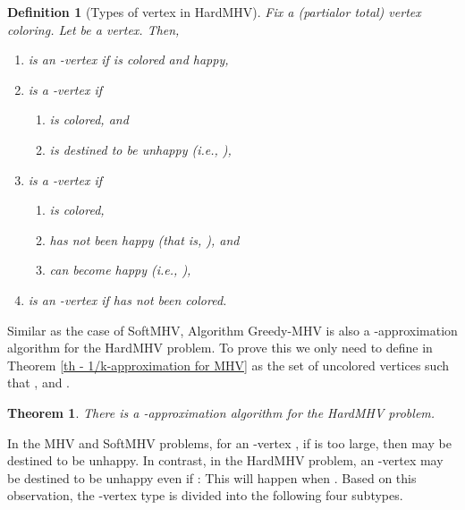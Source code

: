 \documentclass[11pt]{article}
\newtheorem{theorem}{Theorem}[section]
\newtheorem{definition}{Definition}[section]
\newcommand{\qed}{\vrule height4pt width4pt depth2pt}
\begin{document}
\begin{definition}[Types of vertex in HardMHV]
Fix a (partialor total) vertex coloring. Let  be a vertex. Then,
\begin{enumerate}
\item  is an -vertex if  is colored and happy,

\item  is a -vertex if
\begin{enumerate}
\item  is colored, and
\item  is destined to be unhappy (i.e., ),
\end{enumerate}

\item  is a -vertex if
\begin{enumerate}
\item  is colored,
\item  has not been happy (that is, ), and
\item  can become happy (i.e., ),
\end{enumerate}

\item  is an -vertex if  has not been colored.
\end{enumerate}
\end{definition}

Similar as the case of SoftMHV, Algorithm {\sc Greedy-MHV} is also
a -approximation algorithm for the HardMHV problem. To prove this
we only need to define  in Theorem \ref{th - 1/k-approximation for MHV}
as the set of uncolored vertices  such that
, and .

\begin{theorem}
There is a -approximation algorithm for the HardMHV problem. \qed
\end{theorem}


In the MHV and SoftMHV problems, for an -vertex , if  is
too large, then  may be destined to be unhappy.
In contrast, in the HardMHV problem, an -vertex  may be destined to
be unhappy even if : This will happen when .
Based on this observation, the -vertex type is divided into the following
four subtypes.
\end{document}
